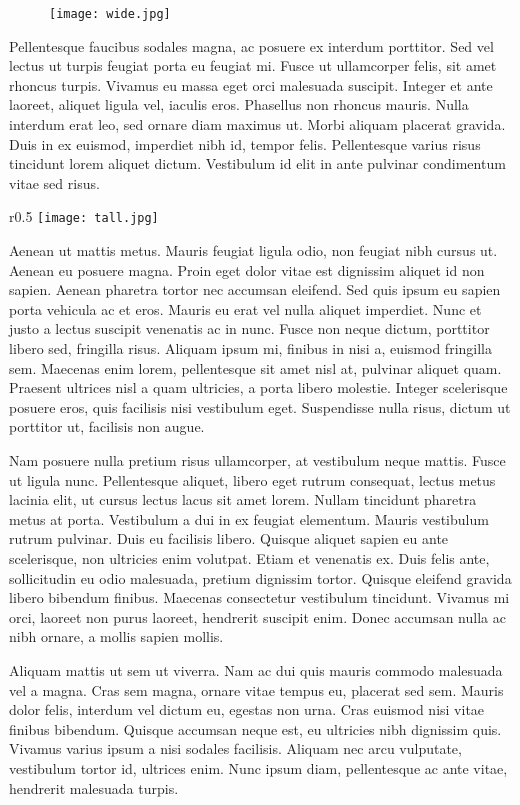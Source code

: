 \begin{figure}[h]
	\texttt{[image: wide.jpg]}
\end{figure}

Pellentesque faucibus sodales magna, ac posuere ex interdum porttitor. Sed vel lectus ut turpis feugiat porta eu feugiat mi. Fusce ut ullamcorper felis, sit amet rhoncus turpis. Vivamus eu massa eget orci malesuada suscipit. Integer et ante laoreet, aliquet ligula vel, iaculis eros. Phasellus non rhoncus mauris. Nulla interdum erat leo, sed ornare diam maximus ut. Morbi aliquam placerat gravida. Duis in ex euismod, imperdiet nibh id, tempor felis. Pellentesque varius risus tincidunt lorem aliquet dictum. Vestibulum id elit in ante pulvinar condimentum vitae sed risus. 

\begin{wrapfigure}{r}{0.5\textwidth}
	\texttt{[image: tall.jpg]}
\end{wrapfigure}
Aenean ut mattis metus. Mauris feugiat ligula odio, non feugiat nibh cursus ut. Aenean eu posuere magna. Proin eget dolor vitae est dignissim aliquet id non sapien. Aenean pharetra tortor nec accumsan eleifend. Sed quis ipsum eu sapien porta vehicula ac et eros. Mauris eu erat vel nulla aliquet imperdiet. Nunc et justo a lectus suscipit venenatis ac in nunc. Fusce non neque dictum, porttitor libero sed, fringilla risus. Aliquam ipsum mi, finibus in nisi a, euismod fringilla sem. Maecenas enim lorem, pellentesque sit amet nisl at, pulvinar aliquet quam. Praesent ultrices nisl a quam ultricies, a porta libero molestie. Integer scelerisque posuere eros, quis facilisis nisi vestibulum eget. Suspendisse nulla risus, dictum ut porttitor ut, facilisis non augue.

Nam posuere nulla pretium risus ullamcorper, at vestibulum neque mattis. Fusce ut ligula nunc. Pellentesque aliquet, libero eget rutrum consequat, lectus metus lacinia elit, ut cursus lectus lacus sit amet lorem. Nullam tincidunt pharetra metus at porta. Vestibulum a dui in ex feugiat elementum. Mauris vestibulum rutrum pulvinar. Duis eu facilisis libero. Quisque aliquet sapien eu ante scelerisque, non ultricies enim volutpat. Etiam et venenatis ex. Duis felis ante, sollicitudin eu odio malesuada, pretium dignissim tortor. Quisque eleifend gravida libero bibendum finibus. Maecenas consectetur vestibulum tincidunt. Vivamus mi orci, laoreet non purus laoreet, hendrerit suscipit enim. Donec accumsan nulla ac nibh ornare, a mollis sapien mollis. 

\begin{myblockquote}
\setlength{\parindent}{0cm}
Aliquam mattis ut sem ut viverra. Nam ac dui quis mauris commodo malesuada vel a magna. Cras sem magna, ornare vitae tempus eu, placerat sed sem. Mauris dolor felis, interdum vel dictum eu, egestas non urna. Cras euismod nisi vitae finibus bibendum. Quisque accumsan neque est, eu ultricies nibh dignissim quis. Vivamus varius ipsum a nisi sodales facilisis. Aliquam nec arcu vulputate, vestibulum tortor id, ultrices enim. Nunc ipsum diam, pellentesque ac ante vitae, hendrerit malesuada turpis. 
\end{myblockquote}

